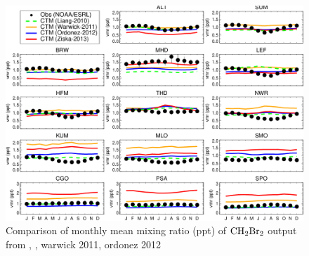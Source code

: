 \begin{figure}
    \centering
    \includegraphics[width =0.7\linewidth]{Appendix/images/Hossaini2013_fig6_ch2br2.png}
    \caption{Comparison of monthly mean mixing ratio (ppt) of $\mathrm{CH_2Br_2}$ output from \cite{Liang2010}, \cite{ziska}, warwick 2011, ordonez 2012}
    \label{fig:Hosaini_fig6}
\end{figure}
